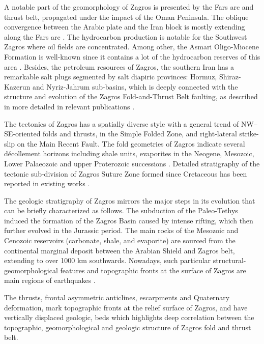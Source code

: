 \documentclass[12pt,a4paper,oneside]{article}
\def \newpar{\vspace{6pt}}
\begin{document}
\newpar A notable part of the geomorphology of Zagros is presented by the Fars arc and thrust belt, propagated under the impact of the Oman Peninsula. The oblique convergence between the Arabic plate and the Iran block is mostly extending along the Fars arc \citep{Aubourg}. The hydrocarbon production is notable for the Southwest Zagros where oil fields are concentrated. Among other, the Asmari Oligo-Miocene Formation is well-known since it contains a lot of the hydrocarbon reserves of this area \citep{Ahmadhadi}. Besides, the petroleum resources of Zagros, the southern Iran has a remarkable salt plugs segmented by salt diapiric provinces: Hormuz, Shiraz-Kazerun and Nyriz-Jahrum sub-basins, which is deeply connected with the structure and evolution of the Zagros Fold-and-Thrust Belt faulting, as described in more detailed in relevant publications \citep{Bahroudi,Khodabakhshnezhad,Jahani}. 

\newpar The tectonics of Zagros has a spatially diverse style with a general trend of NW–SE-oriented folds and thrusts, in the Simple Folded Zone, and right-lateral strike-slip on the Main Recent Fault. The fold geometries of Zagros indicate several décollement horizons including shale units, evaporites in the Neogene, Mesozoic, Lower Palaeozoic and upper Proterozoic successions \citep{Blanc}. Detailed stratigraphy of the tectonic sub-division of Zagros Suture Zone formed since Cretaceous has been reported in existing works \citep{Ali2014,Authemayou,Ali2012}. 

\newpar The geologic stratigraphy of Zagros mirrors the major steps in its evolution that can be briefly characterized as follows. The subduction of the Paleo-Tethys induced the formation of the Zagros Basin caused by intense rifting, which then further evolved in the Jurassic period. The main rocks of the Mesozoic and Cenozoic reservoirs (carbonate, shale, and evaporite) are sourced from the continental marginal deposit between the Arabian Shield and Zagros belt, extending to over 1000 km southwards. Nowadays, such particular structural-geomorphological features and topographic fronts at the surface of Zagros are main regions of earthquakes \citep{Berberian}. 

\newpar The thrusts, frontal asymmetric anticlines, escarpments and Quaternary deformation, mark topographic fronts at the relief surface of Zagros, and have vertically displaced geologic, beds which highlights deep correlation between the topographic, geomorphological and geologic structure of Zagros fold and thrust belt.
\end{document}
